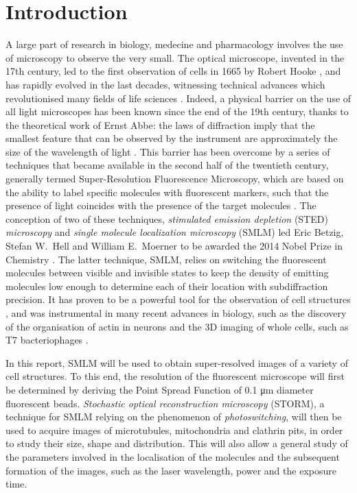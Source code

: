 \section{Introduction}
A large part of research in biology, medecine and pharmacology involves the use of microscopy to observe the very small.
The optical microscope, invented in the 17th century, led to the first observation of cells in 1665 by Robert Hooke \cite{reigoto_comparative_2021}, and has rapidly evolved in the last decades, witnessing technical advances which revolutionised many fields of life sciences \cite{balasubramanian_imagining_2023}.
Indeed, a physical barrier on the use of all light microscopes has been known since the end of the 19th century, thanks to the theoretical work of Ernst Abbe: the laws of diffraction imply that the smallest feature that can be observed by the instrument are approximately the size of the wavelength of light \cite{diaspro_fundamentals_2011}.
This barrier has been overcome by a series of techniques that became available in the second half of the twentieth century, generally termed Super-Resolution Fluorescence Microscopy, which are based on the ability to label specific molecules with fluorescent markers, such that the presence of light coincides with the presence of the target molecules \cite{douglass_notice_2023}.
The conception of two of these techniques, \emph{stimulated emission depletion} (STED) \emph{microscopy} and \emph{single molecule localization microscopy} (SMLM) led Eric Betzig, Stefan W.~Hell and William E.~Moerner to be awarded the 2014 Nobel Prize in Chemistry \cite{nobel_press_2014}.
The latter technique, SMLM, relies on switching the fluorescent molecules between visible and invisible states to keep the density of emitting molecules low enough to determine each of their location with subdiffraction precision.
It has proven to be a powerful tool for the observation of cell structures \cite{baddeley_biological_2018}, 
and was instrumental in many recent advances in biology, such as the discovery of the organisation of actin in neurons \cite{xu_actin_2013} and the 3D imaging of whole cells, such as T7 bacteriophages \cite{huang_ultra-high_2016}.

In this report, SMLM will be used to obtain super-resolved images of a variety of cell structures.
To this end, the resolution of the fluorescent microscope will first be determined by deriving the Point Spread Function of 0.1 \unit{\micro m} diameter fluorescent beads.
\emph{Stochastic optical reconstruction microscopy} (STORM), a technique for SMLM relying on the phenomenon of \emph{photoswitching}, will then be used to acquire images of microtubules, mitochondria and clathrin pits, in order to study their size, shape and distribution.
This will also allow a general study of the parameters involved in the localisation of the molecules and the subsequent formation of the images, such as the laser wavelength, power and the exposure time.